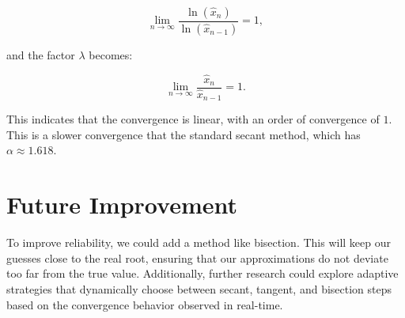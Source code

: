 \documentclass[10pt]{article}
\begin{document}
\begin{equation*}
\lim_{n \to \infty} \frac{\ln(\hat{x}_n)}{\ln(\hat{x}_{n-1})} = 1,
\end{equation*}

and the factor $\lambda$ becomes:

\begin{equation*}
\lim_{n \to \infty} \frac{\hat{x}_n}{\hat{x}_{n-1}} = 1.
\end{equation*}

This indicates that the convergence is linear, with an order of convergence of $1$.
This is a slower convergence that the standard secant method, which has \(\alpha \approx 1.618\).

\section*{Future Improvement}
To improve reliability, we could add a method like bisection. This will keep our guesses close to the real root, ensuring that our approximations do not deviate too far from the true value. Additionally, further research could explore adaptive strategies that dynamically choose between secant, tangent, and bisection steps based on the convergence behavior observed in real-time.
\end{document}
